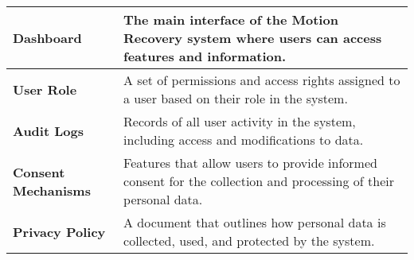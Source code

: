 \begin{table}
\begin{tabular}{|p{}|p{}|}
        \hline
        \textbf{Dashboard} & The main interface of the Motion Recovery system where users can access features and information. \\
        \hline
        \textbf{User Role} & A set of permissions and access rights assigned to a user based on their role in the system. \\
        \hline
        \textbf{Audit Logs} & Records of all user activity in the system, including access and modifications to data. \\
        \hline
        \textbf{Consent Mechanisms} & Features that allow users to provide informed consent for the collection and processing of their personal data. \\
        \hline
        \textbf{Privacy Policy} & A document that outlines how personal data is collected, used, and protected by the system. \\
        \hline
    \end{tabular}
\end{table}